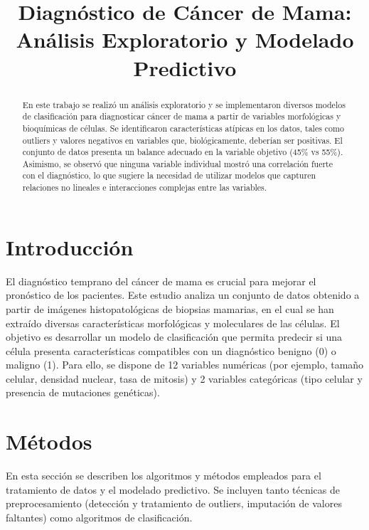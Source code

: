 


\title{Diagnóstico de Cáncer de Mama: Análisis Exploratorio y Modelado Predictivo}
\begin{abstract}
En este trabajo se realizó un análisis exploratorio y se implementaron diversos modelos de clasificación para diagnosticar cáncer de mama a partir de variables morfológicas y bioquímicas de células. Se identificaron características atípicas en los datos, tales como outliers y valores negativos en variables que, biológicamente, deberían ser positivas. El conjunto de datos presenta un balance adecuado en la variable objetivo (45\% vs 55\%). Asimismo, se observó que ninguna variable individual mostró una correlación fuerte con el diagnóstico, lo que sugiere la necesidad de utilizar modelos que capturen relaciones no lineales e interacciones complejas entre las variables.
\end{abstract}

\section{Introducción}
El diagnóstico temprano del cáncer de mama es crucial para mejorar el pronóstico de los pacientes. Este estudio analiza un conjunto de datos obtenido a partir de imágenes histopatológicas de biopsias mamarias, en el cual se han extraído diversas características morfológicas y moleculares de las células. El objetivo es desarrollar un modelo de clasificación que permita predecir si una célula presenta características compatibles con un diagnóstico benigno (0) o maligno (1). Para ello, se dispone de 12 variables numéricas (por ejemplo, tamaño celular, densidad nuclear, tasa de mitosis) y 2 variables categóricas (tipo celular y presencia de mutaciones genéticas).

\section{Métodos}
En esta sección se describen los algoritmos y métodos empleados para el tratamiento de datos y el modelado predictivo. Se incluyen tanto técnicas de preprocesamiento (detección y tratamiento de outliers, imputación de valores faltantes) como algoritmos de clasificación.

